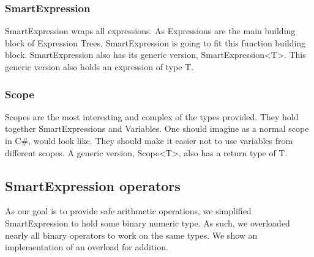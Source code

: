 \subsubsection{SmartExpression}
SmartExpression wraps all expressions. As Expressions are the main building block of Expression Trees, SmartExpression is going to fit this function building block. SmartExpression also has its generic version, SmartExpression<T>. This generic version also holds an expression of type T. 


\subsubsection{Scope}
Scopes are the most interesting and complex of the types provided. They hold together SmartExpressions and Variables. One should imagine as a normal scope in C\#, would look like. They should make it easier not to use variables from different scopes. A generic version, Scope<T>, also has a return type of T. 


\subsection{SmartExpression operators}
As our goal is to provide safe arithmetic operations, we simplified SmartExpression to hold some binary numeric type. As such, we overloaded nearly all binary operators to work on the same types. We show an implementation of an overload for addition.

